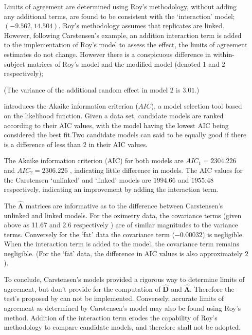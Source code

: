 \documentclass[12pt, a4paper]{report}
\theoremstyle{plain}
\theoremstyle{definition}
\theoremstyle{remark}
\begin{document}
	Limits of agreement are determined using Roy's methodology, without adding any additional terms, are found to be consistent with the `interaction' model; $(-9.562, 14.504 )$. Roy's methodology assumes that replicates are linked. However, following Carstensen's example, an addition interaction term is added to the implementation of Roy's model to assess the effect, the limits of agreement estimates do not change. However there is a conspicuous difference in within-subject matrices of Roy's model and the modified model (denoted $1$ and $2$ respectively);
	
	\noindent (The variance of the additional random effect in model $2$ is $3.01$.)
	
	\citet{akaike} introduces the Akaike information criterion ($AIC$), a model
	selection tool based on the likelihood function. Given a data set, candidate models
	are ranked according to their AIC values, with the model having the lowest AIC being considered the best fit.Two candidate models can said to be equally good if there is a difference of less than $2$ in their AIC values.
	
	The Akaike information criterion (AIC) for both models are $AIC_{1} = 2304.226$ and $AIC_{2} = 2306.226$ , indicating little difference in models. The AIC values for the Carstensen `unlinked' and `linked' models are $1994.66$ and $1955.48$ respectively, indicating an improvement by adding the interaction term.
	
	The $\boldsymbol{\hat{\Lambda}}$ matrices are informative as to the difference between Carstensen's unlinked and linked models. For the oximetry data, the covariance terms (given above as 11.67 and 2.6 respectively ) are of similar magnitudes to the variance terms. Conversely for the `fat' data the covariance term ($-0.00032$) is negligible. When the interaction term is added to the model, the covariance term remains negligible. (For the `fat' data, the difference in AIC values is also approximately $2$).
	
	To conclude, Carstensen's models provided a rigorous way to determine limits of agreement, but don't provide for the computation of $\boldsymbol{\hat{D}}$ and $\boldsymbol{\hat{\Lambda}}$. Therefore the test's proposed by \citet{ARoy2009} can not be implemented. Conversely, accurate limits of agreement as determined by Carstensen's model may also be found using Roy's method. Addition of the interaction term erodes the capability of Roy's methodology to compare candidate models, and therefore shall not be adopted.
	
\end{document}
